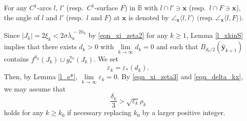 \documentclass{amsart}
\theoremstyle{plain}
\theoremstyle{definition}
\numberwithin{equation}{section}
\numberwithin{figure}{section}
\def\bb{\mathbb{B}}
\def\bx{{\boldsymbol{x}}}
\def\by{{\boldsymbol{y}}}
\def\wh{\widehat}
\def\ve{\varepsilon}
\def\ol{\overline}
\def\ru{{\mathrm{u}}}
\begin{document}
For any $C^1$-arcs $l$, $l'$ (resp.\ $C^1$-surface $F$) in $\bb$ with $l\cap l'\ni \bx$ (resp.\ 
$l\cap F\ni \bx$), 
the angle of $l$ and $l'$ (resp.\ $l$ and $F$) at $\bx$ is denoted by 
$\angle_{\bx}\langle l,l'\rangle$ $\bigl(\text{resp.}\  \angle_{\bx}\langle l,F\rangle\bigr)$.


Since $|J_k|=2\xi_k<2\sigma\ol\lambda_{\ru}^{\,-2\wh n_k}$ by \eqref{eqn_xi_zeta2} for any $k\geq 1$, Lemma \ref{l_xkinS} implies that there exists $d_k>0$ with $\lim\limits_{k\to \infty}d_k=0$ 
and such that $B_{d_k/2}(\wh\by_{k+1})$ contains $f^{\wh n_k}(J_k)\cup g_*^{\wh n_k}(J_k)$.
We set 
\[
\ve_k=\ve_*(d_k).
\]
Then, by Lemma \ref{l_e*}, $\lim\limits_{k\to \infty}\ve_k=0$.
By \eqref{eqn_xi_zeta3} and \eqref{eqn_delta_kx}, we may assume that 
\begin{equation}\label{eqn_delta_rho}
\frac{\delta_k}3>\sqrt{\ve_k}\rho_k 
\end{equation}
holds for any $k\geq k_0$ if necessary replacing $k_0$ by a larger positive integer.
\end{document}
